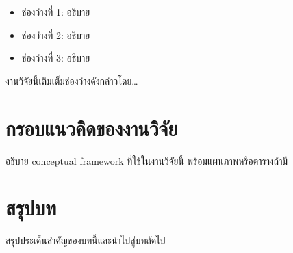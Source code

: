 \documentclass[10pt,a4paper]{report}
\begin{document}
\begin{itemize}[nosep, leftmargin=2em]
  \item ช่องว่างที่ 1: อธิบาย
  \item ช่องว่างที่ 2: อธิบาย
  \item ช่องว่างที่ 3: อธิบาย
\end{itemize}

\vspace{12pt}
งานวิจัยนี้เติมเต็มช่องว่างดังกล่าวโดย\ldots

\section{กรอบแนวคิดของงานวิจัย}

อธิบาย conceptual framework ที่ใช้ในงานวิจัยนี้
พร้อมแผนภาพหรือตารางถ้ามี

\section{สรุปบท}

สรุปประเด็นสำคัญของบทนี้และนำไปสู่บทถัดไป
\end{document}
